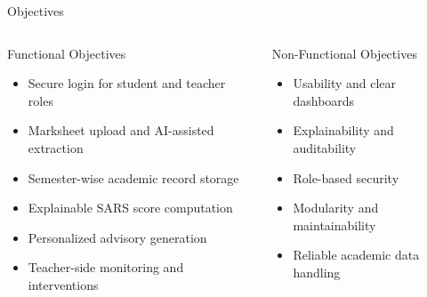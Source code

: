 \documentclass[aspectratio=169]{beamer}
\begin{document}
\begin{frame}{Objectives}
  \begin{columns}[T]
    \begin{block}{Functional Objectives}
      \begin{itemize}
        \item Secure login for student and teacher roles
        \item Marksheet upload and AI-assisted extraction
        \item Semester-wise academic record storage
        \item Explainable SARS score computation
        \item Personalized advisory generation
        \item Teacher-side monitoring and interventions
      \end{itemize}
    \end{block}
    \begin{block}{Non-Functional Objectives}
      \begin{itemize}
        \item Usability and clear dashboards
        \item Explainability and auditability
        \item Role-based security
        \item Modularity and maintainability
        \item Reliable academic data handling
      \end{itemize}
    \end{block}
  \end{columns}
\end{frame}
\end{document}
